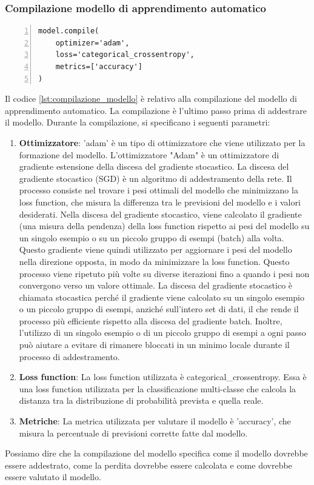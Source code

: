 \documentclass[a4paper,final,12pt]{report}
\begin{document}
\subsubsection{Compilazione modello di apprendimento automatico}
\begin{lstlisting}[caption={Compilazione del modello di apprendimento automatico.}, label={lst:compilazione_modello}, breaklines, escapechar=`\%, frame=lines, basicstyle=\small\ttfamily, keepspaces=true, numbers=left]
model.compile(
    optimizer='adam',
    loss='categorical_crossentropy',
    metrics=['accuracy']
)
\end{lstlisting}
Il codice \ref{lst:compilazione_modello} è relativo alla compilazione del modello di apprendimento automatico. La compilazione è l'ultimo passo prima di addestrare il modello. Durante la compilazione, si specificano i seguenti parametri:
\begin{enumerate}
    \item \textbf{Ottimizzatore}: 'adam' è un tipo di ottimizzatore che viene utilizzato per la formazione del modello. L'ottimizzatore "Adam" è un ottimizzatore di gradiente estensione della discesa del gradiente stocastico. La discesa del gradiente stocastico (SGD) è un algoritmo di addestramento della rete. Il processo consiste nel trovare i pesi ottimali del modello che minimizzano la loss function, che misura la differenza tra le previsioni del modello e i valori desiderati. Nella discesa del gradiente stocastico, viene calcolato il gradiente (una misura della pendenza) della loss function rispetto ai pesi del modello su un singolo esempio o su un piccolo gruppo di esempi (batch) alla volta. Questo gradiente viene quindi utilizzato per aggiornare i pesi del modello nella direzione opposta, in modo da minimizzare la loss function. Questo processo viene ripetuto più volte su diverse iterazioni fino a quando i pesi non convergono verso un valore ottimale. La discesa del gradiente stocastico è chiamata stocastica perché il gradiente viene calcolato su un singolo esempio o un piccolo gruppo di esempi, anziché sull'intero set di dati, il che rende il processo più efficiente rispetto alla discesa del gradiente batch. Inoltre, l'utilizzo di un singolo esempio o di un piccolo gruppo di esempi a ogni passo può aiutare a evitare di rimanere bloccati in un minimo locale durante il processo di addestramento.
    \item \textbf{Loss function}: La loss function utilizzata è categorical\_crossentropy. Essa è una loss function utilizzata per la classificazione multi-classe che calcola la distanza tra la distribuzione di probabilità prevista e quella reale.
    \item \textbf{Metriche}: La metrica utilizzata per valutare il modello è 'accuracy', che misura la percentuale di previsioni corrette fatte dal modello.
\end{enumerate}
Possiamo dire che la compilazione del modello specifica come il modello dovrebbe essere addestrato, come la perdita dovrebbe essere calcolata e come dovrebbe essere valutato il modello.\\
\end{document}
